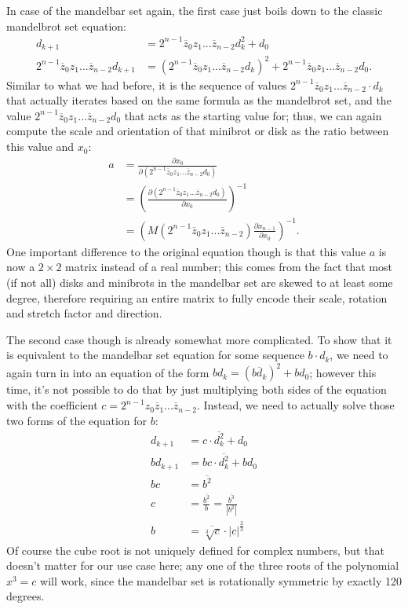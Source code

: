\documentclass[12pt,a4paper]{article}
\newcommand{\eqar}[1]{\begin{align*} #1 \end{align*}}
\newcommand{\jmat}[2]{\frac{\partial #1}{\partial #2}}
\begin{document}
In case of the mandelbar set again, the first case just boils down to the classic mandelbrot set equation:
\eqar{
	d_{k+1} &= 2^{n-1}\overline{z}_0z_1...\overline{z}_{n-2}d_k^2+d_0\\
	2^{n-1}\overline{z}_0z_1...\overline{z}_{n-2}d_{k+1} &= (2^{n-1}\overline{z}_0z_1...\overline{z}_{n-2}d_k)^2+2^{n-1}\overline{z}_0z_1...\overline{z}_{n-2}d_0.
}
Similar to what we had before, it is the sequence of values $2^{n-1}\overline{z}_0z_1...\overline{z}_{n-2}\cdot d_k$ that actually iterates based on the same formula as the mandelbrot set, and the value $2^{n-1}\overline{z}_0z_1...\overline{z}_{n-2}d_0$ that acts as the starting value for; thus, we can again compute the scale and orientation of that minibrot or disk as the ratio between this value and $x_0$:
\eqar{
	a &= \jmat{x_0}{(2^{n-1}\overline{z}_0z_1...\overline{z}_{n-2}d_0)}\\
	&= \left(\jmat{(2^{n-1}\overline{z}_0z_1...\overline{z}_{n-2}d_0)}{x_0}\right)^{-1}\\
	&= \left(M(2^{n-1}\overline{z}_0z_1...\overline{z}_{n-2})\jmat{x_{n-1}}{x_0}\right)^{-1}.
}
One important difference to the original equation though is that this value $a$ is now a $2\times2$ matrix instead of a real number; this comes from the fact that most (if not all) disks and minibrots in the mandelbar set are skewed to at least some degree, therefore requiring an entire matrix to fully encode their scale, rotation and stretch factor and direction.

The second case though is already somewhat more complicated. To show that it is equivalent to the mandelbar set equation for some sequence $b\cdot d_k$, we need to again turn in into an equation of the form $bd_k=(\overline{bd_k})^2+bd_0$; however this time, it's not possible to do that by just multiplying both sides of the equation with the coefficient $c=2^{n-1}z_0\overline{z}_1...\overline{z}_{n-2}$. Instead, we need to actually solve those two forms of the equation for $b$:
\eqar{
	d_{k+1} &= c\cdot\overline{d_k^2}+d_0\\
	bd_{k+1} &= bc\cdot\overline{d_k^2}+bd_0\\
	bc &= \overline{b^2}\\
	c &= \frac{\overline{b^2}}{b} = \frac{\overline{b^3}}{\left|b^2\right|}\\
	b &= \overline{\sqrt[3]{c}}\cdot\left|c\right|^\frac{2}{3}
}
Of course the cube root is not uniquely defined for complex numbers, but that doesn't matter for our use case here; any one of the three roots of the polynomial $x^3=c$ will work, since the mandelbar set is rotationally symmetric by exactly 120 degrees.
\end{document}
